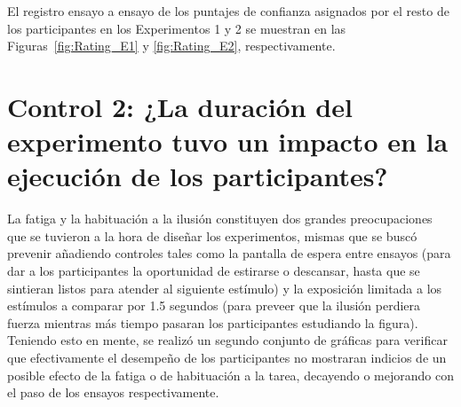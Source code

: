 \begin{itemize}
El registro ensayo a ensayo de los puntajes de confianza asignados por el resto de los participantes en los Experimentos 1 y 2 se muestran en las Figuras~\ref{fig:Rating_E1} y \ref{fig:Rating_E2}, respectivamente.\\

\end{itemize}








\section{Control 2: ¿La duración del experimento tuvo un impacto en la ejecución de los participantes?}

La fatiga y la habituación a la ilusión constituyen dos grandes preocupaciones que se tuvieron a la hora de diseñar los experimentos, mismas que se buscó prevenir añadiendo controles tales como la pantalla de espera entre ensayos (para dar a los participantes la oportunidad de estirarse o descansar, hasta que se sintieran listos para atender al siguiente estímulo) y la exposición limitada a los estímulos a comparar por 1.5 segundos (para preveer que la ilusión perdiera fuerza mientras más tiempo pasaran los participantes estudiando la figura). Teniendo esto en mente, se realizó un segundo conjunto de gráficas para verificar que efectivamente el desempeño de los participantes no mostraran indicios de un posible efecto de la fatiga  o de habituación a la tarea, decayendo o mejorando con el paso de los ensayos respectivamente.\\ 


